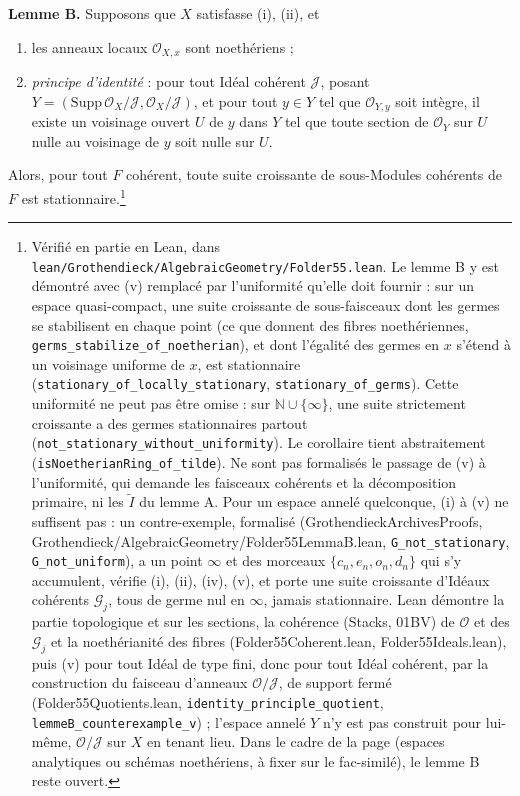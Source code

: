 \documentclass[11pt,a4paper]{article}
\begin{document}
\textbf{Lemme B.} Supposons que $X$ satisfasse (i), (ii), et
\begin{enumerate}
\item[(iv)] les anneaux locaux $\mathcal{O}_{X,x}$ sont noethériens ;
\item[(v)] \emph{principe d'identité} : pour tout Idéal cohérent $\mathcal{J}$,
posant $Y = (\mathrm{Supp}\, \mathcal{O}_{X}/\mathcal{J},
\mathcal{O}_{X}/\mathcal{J})$, et pour tout $y \in Y$ tel que
$\mathcal{O}_{Y,y}$ soit intègre, il existe un voisinage ouvert $U$ de $y$
dans $Y$ tel que toute section de $\mathcal{O}_{Y}$ sur $U$ nulle au voisinage
de $y$ soit nulle sur $U$.
\end{enumerate}
Alors, pour tout $F$ cohérent, toute suite croissante de sous-Modules cohérents
de $F$ est stationnaire.\footnote{Vérifié en partie en Lean, dans
\texttt{lean/Grothendieck/AlgebraicGeometry/Folder55.lean}. Le lemme B y est démontré avec (v)
remplacé par l'uniformité qu'elle doit fournir : sur un espace
quasi-compact, une suite croissante de sous-faisceaux dont les germes se
stabilisent en chaque point (ce que donnent des fibres noethériennes,
\texttt{germs\_stabilize\_of\_noetherian}), et dont l'égalité des germes en $x$
s'étend à un voisinage uniforme de $x$, est stationnaire
(\texttt{stationary\_of\_locally\_stationary}, \texttt{stationary\_of\_germs}).
Cette uniformité ne peut pas être omise : sur $\mathbb{N} \cup \{\infty\}$, une
suite strictement croissante a des germes stationnaires partout
(\texttt{not\_stationary\_without\_uniformity}). Le corollaire tient
abstraitement (\texttt{isNoetherianRing\_of\_tilde}). Ne sont pas formalisés
le passage de (v) à l'uniformité, qui demande les faisceaux cohérents et la
décomposition primaire, ni les $\widetilde{I}$ du lemme A. Pour un espace
annelé quelconque, (i) à (v) ne suffisent pas : un contre-exemple, formalisé
(GrothendieckArchivesProofs, Grothendieck/AlgebraicGeometry/Folder55LemmaB.lean,
\texttt{G\_not\_stationary}, \texttt{G\_not\_uniform}), a un point $\infty$ et
des morceaux $\{c_{n}, e_{n}, o_{n}, d_{n}\}$ qui s'y accumulent, vérifie (i),
(ii), (iv), (v), et porte une suite croissante d'Idéaux cohérents
$\mathcal{G}_{j}$, tous de germe nul en $\infty$, jamais stationnaire. Lean
démontre la partie topologique et sur les sections, la cohérence (Stacks,
01BV) de $\mathcal{O}$ et des $\mathcal{G}_{j}$ et la noethérianité des fibres
(Folder55Coherent.lean, Folder55Ideals.lean), puis (v) pour tout Idéal de type
fini, donc pour tout Idéal cohérent, par la construction du faisceau d'anneaux
$\mathcal{O}/\mathcal{J}$, de support fermé (Folder55Quotients.lean,
\texttt{identity\_principle\_quotient}, \texttt{lemmeB\_counterexample\_v}) ;
l'espace annelé $Y$ n'y est pas construit pour lui-même, $\mathcal{O}/\mathcal{J}$
sur $X$ en tenant lieu. Dans le cadre de la page (espaces analytiques ou schémas
noethériens, à fixer sur le fac-similé), le lemme B reste ouvert.}
\end{document}
